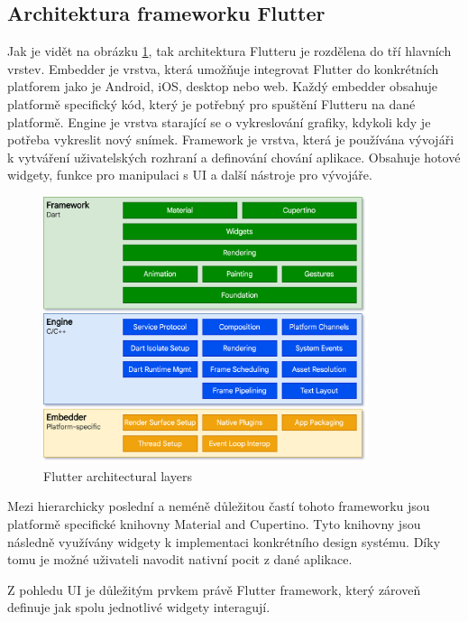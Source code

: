 \subsection*{Architektura frameworku Flutter} 
Jak je vidět na obrázku \ref{fig:flutter_architectural_layers}, tak architektura Flutteru je rozdělena do tří hlavních vrstev. \cite{flutterArchOverview}
Embedder je vrstva, která umožňuje integrovat Flutter do konkrétních platforem jako je Android, iOS, desktop nebo web. 
Každý embedder obsahuje platformě specifický kód, který je potřebný pro spuštění Flutteru na dané platformě.
Engine je vrstva starající se o vykreslování grafiky, kdykoli kdy je potřeba vykreslit nový snímek. \cite{flutterArchOverview} 
Framework je vrstva, která je používána vývojáři k vytváření uživatelských rozhraní a definování chování aplikace. 
Obsahuje hotové widgety, funkce pro manipulaci s UI a další nástroje pro vývojáře. \cite{flutterArchOverview} 


\begin{figure}[H]
  \centering
  \includegraphics[width=0.85\textwidth]{flutter_architectural_layers.png}
  \caption{Flutter architectural layers}
  \label{fig:flutter_architectural_layers}
\end{figure}

Mezi hierarchicky poslední a neméně důležitou častí tohoto frameworku jsou platformě specifické knihovny Material and Cupertino. Tyto knihovny
jsou následně využívány widgety k implementaci konkrétního design systému. Díky tomu je možné uživateli navodit nativní pocit z dané aplikace.

\medskip

Z pohledu UI je důležitým prvkem právě Flutter framework, který zároveň definuje jak spolu jednotlivé widgety interagují.

